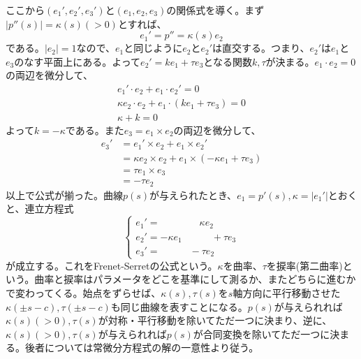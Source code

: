     ここから$(e_1',e_2',e_3')$と$(e_1,e_2,e_3)$の関係式を導く。まず$|p''(s)| = \kappa(s)(>0)$とすれば、
        \[e_1' = p'' = \kappa(s) e_2\]
    である。$|e_2| = 1$なので、$e_1$と同じように$e_2$と$e_2'$は直交する。つまり、$e_2'$は$e_1$と$e_3$のなす平面上にある。よって$e_2' = ke_1 + \tau e_3$となる関数$k,\tau$が決まる。$e_1\cdot e_2 = 0$の両辺を微分して、
    \begin{align*}
        e_1'\cdot e_2 + e_1\cdot e_2' = 0\\
        \kappa e_2\cdot e_2 + e_1\cdot (ke_1 + \tau e_3) = 0\\
        \kappa + k = 0
    \end{align*}
    よって$k = -\kappa$である。また$e_3 = e_1\times e_2$の両辺を微分して、
    \begin{align*}
        e_3'
        &= e_1'\times e_2+e_1\times e_2'\\
        &= \kappa e_2\times e_2+e_1\times (-\kappa e_1+\tau e_3)\\
        &= \tau e_1\times e_3\\
        &= -\tau e_2
    \end{align*}
    以上で公式が揃った。曲線$p(s)$が与えられたとき、$e_1 = p'(s),\kappa = |e_1'|$とおくと、連立方程式
        \[
            \begin{cases}
                e_1' = \qquad\qquad \kappa e_2\\
                e_2' = -\kappa e_1\quad\qquad +\tau e_3\\
                e_3' = \quad\qquad -\tau e_2
            \end{cases}
        \]
    が成立する。これをFrenet-Serretの公式という。$\kappa$を曲率、$\tau$を捩率(第二曲率)という。曲率と捩率はパラメータをどこを基準にして測るか、またどちらに進むかで変わってくる。始点をずらせば、$\kappa(s),\tau(s)$を$s$軸方向に平行移動させた$\kappa(\pm s-c),\tau(\pm s-c)$も同じ曲線を表すことになる。$p(s)$が与えられれば$\kappa(s)(>0),\tau(s)$が対称・平行移動を除いてただ一つに決まり、逆に、$\kappa(s)(>0),\tau(s)$が与えられれば$p(s)$が合同変換を除いてただ一つに決まる。後者については常微分方程式の解の一意性より従う。